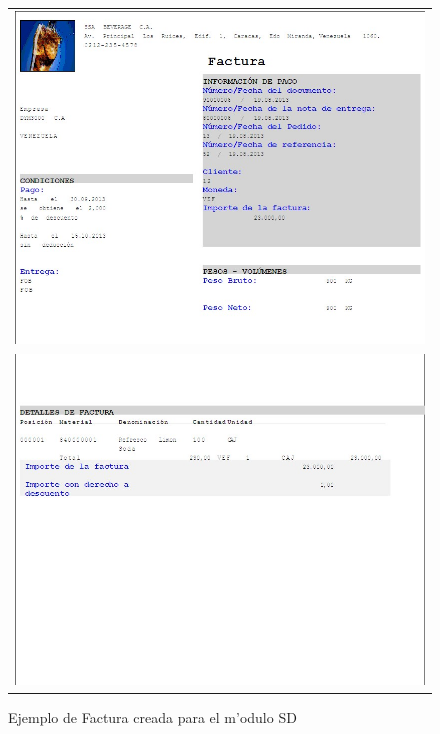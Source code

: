 \begin{figure}[htb]
\centering
\begin{tabular}{c}
\includegraphics[scale=0.65,type=jpg,ext=.jpg,read=.jpg]{figures/Factura1}\\
\includegraphics[scale=0.65,type=jpg,ext=.jpg,read=.jpg]{figures/Factura2}\\
\end{tabular}
\caption{Ejemplo de Factura creada para el m'odulo SD}
\label{fig:facturas}
\end{figure}

